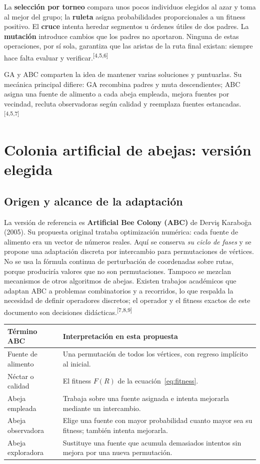 \documentclass[11pt,letterpaper]{article}
\newcommand{\src}[1]{\textsuperscript{\textcolor{cian}{[#1]}}}
\begin{document}
La \textbf{selección por torneo} compara unos pocos individuos elegidos al azar y toma al mejor del grupo; la \textbf{ruleta} asigna probabilidades proporcionales a un fitness positivo. El \textbf{cruce} intenta heredar segmentos u órdenes útiles de dos padres. La \textbf{mutación} introduce cambios que los padres no aportaron. Ninguna de estas operaciones, por sí sola, garantiza que las aristas de la ruta final existan: siempre hace falta evaluar y verificar.\src{4,5,6}

GA y ABC comparten la idea de mantener varias soluciones y puntuarlas. Su mecánica principal difiere: GA recombina padres y muta descendientes; ABC asigna una fuente de alimento a cada abeja empleada, mejora fuentes por vecindad, recluta observadoras según calidad y reemplaza fuentes estancadas.\src{4,5,7}

\section{Colonia artificial de abejas: versión elegida}
\subsection{Origen y alcance de la adaptación}
La versión de referencia es \textbf{Artificial Bee Colony (ABC)} de Derviş Karaboğa (2005). Su propuesta original trataba optimización numérica: cada fuente de alimento era un vector de números reales. Aquí se conserva \emph{su ciclo de fases} y se propone una adaptación discreta por intercambio para permutaciones de vértices. No se usa la fórmula continua de perturbación de coordenadas sobre rutas, porque produciría valores que no son permutaciones. Tampoco se mezclan mecanismos de otros algoritmos de abejas. Existen trabajos académicos que adaptan ABC a problemas combinatorios y a recorridos, lo que respalda la necesidad de definir operadores discretos; el operador y el fitness exactos de este documento son decisiones didácticas.\src{7,8,9}

\begin{center}
\begin{tabular}{p{3.2cm}p{10.0cm}}
\toprule
\textbf{Término ABC} & \textbf{Interpretación en esta propuesta}\\
\midrule
Fuente de alimento & Una permutación de todos los vértices, con regreso implícito al inicial.\\
Néctar o calidad & El fitness $F(R)$ de la ecuación~\eqref{eq:fitness}.\\
Abeja empleada & Trabaja sobre una fuente asignada e intenta mejorarla mediante un intercambio.\\
Abeja observadora & Elige una fuente con mayor probabilidad cuanto mayor sea su fitness; también intenta mejorarla.\\
Abeja exploradora & Sustituye una fuente que acumula demasiados intentos sin mejora por una nueva permutación.\\
\bottomrule
\end{tabular}
\end{center}
\end{document}
